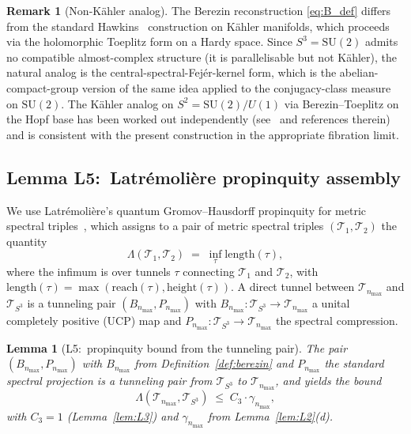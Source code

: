 \documentclass[11pt,a4paper]{article}
\theoremstyle{plain}
\newtheorem{lemma}[theorem]{Lemma}
\theoremstyle{definition}
\newtheorem{remark}[theorem]{Remark}
\newcommand{\nmax}{n_{\max}}
\newcommand{\sthree}{S^{3}}
\newcommand{\Tcal}{\mathcal{T}}
\newcommand{\SU}{\mathrm{SU}}
\begin{document}
\begin{remark}[Non-K\"ahler analog]
The Berezin reconstruction \eqref{eq:B_def} differs from the standard
Hawkins~\cite{hawkins2000} construction on K\"ahler manifolds, which
proceeds via the holomorphic Toeplitz form on a Hardy space. Since
$\sthree = \SU(2)$ admits no compatible almost-complex structure
(it is parallelisable but not K\"ahler), the natural analog is the
central-spectral-Fej\'er-kernel form, which is the
abelian-compact-group version
of the same idea applied to the conjugacy-class measure on $\SU(2)$.
The K\"ahler analog on $S^2 = \SU(2)/U(1)$ via Berezin--Toeplitz on
the Hopf base has been worked out independently
(see~\cite{ucp_maps_2024} and references therein) and is consistent
with the present construction in the appropriate fibration limit.
\end{remark}

\subsection{Lemma L5:\ Latr\'emoli\`ere propinquity assembly}
\label{sec:L5}

We use Latr\'emoli\`ere's quantum Gromov--Hausdorff propinquity for
metric spectral triples~\cite{latremoliere2018,
latremoliere_metric_st_2017}, which assigns to a pair of metric
spectral triples $(\Tcal_1, \Tcal_2)$ the quantity
\begin{equation}\label{eq:propinquity_def}
   \Lambda(\Tcal_1, \Tcal_2)
   \;=\; \inf_\tau \mathrm{length}(\tau),
\end{equation}
where the infimum is over tunnels $\tau$ connecting $\Tcal_1$ and
$\Tcal_2$, with $\mathrm{length}(\tau) = \max(\mathrm{reach}(\tau),
\mathrm{height}(\tau))$. A direct tunnel between $\Tcal_{\nmax}$ and
$\Tcal_{\sthree}$ is a tunneling pair $(B_{\nmax}, P_{\nmax})$ with
$B_{\nmax}: \Tcal_{\sthree} \to \Tcal_{\nmax}$ a unital completely
positive (UCP) map and $P_{\nmax}: \Tcal_{\sthree} \to \Tcal_{\nmax}$
the spectral compression.

\begin{lemma}[L5:\ propinquity bound from the tunneling pair]\label{lem:L5}
The pair $(B_{\nmax}, P_{\nmax})$ with $B_{\nmax}$ from
Definition~\ref{def:berezin} and $P_{\nmax}$ the standard spectral
projection is a tunneling pair from $\Tcal_{\sthree}$ to
$\Tcal_{\nmax}$, and yields the bound
\begin{equation}\label{eq:L5_bound}
   \Lambda(\Tcal_{\nmax}, \Tcal_{\sthree})
   \;\le\; C_3 \cdot \gamma_{\nmax},
\end{equation}
with $C_3 = 1$ (Lemma~\ref{lem:L3}) and $\gamma_{\nmax}$ from
Lemma~\ref{lem:L2}(d).
\end{lemma}
\end{document}
